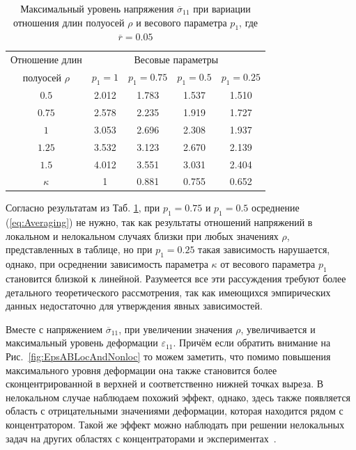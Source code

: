 \begin{table}[htbp]
    \centering
    \begin{threeparttable}%
        \caption{Максимальный уровень напряжения $\overline{\sigma}_{11}$ при вариации отношения длин полуосей $\rho$ и весового параметра $p_1$, где $\overline{r} = 0.05$}\label{tab:MaxStress}%
        \begin{tabular}{|c|c|c|c|c|}
	        \hline
			Отношение длин    & \multicolumn{4}{c|}{Весовые параметры} \\
			\cline{2-5}
			полуосей $\rho$   & $p_1 = 1$ & $p_1 = 0.75$ & $p_1 = 0.5$ & $p_1 = 0.25$ \\
			\hline
			$0.5$             & 2.012     & 1.783        & 1.537       & 1.510 \\
			\hline
			$0.75$            & 2.578     & 2.235        & 1.919       & 1.727 \\
			\hline
			$1$               & 3.053     & 2.696        & 2.308       & 1.937 \\
			\hline
			$1.25$            & 3.532     & 3.123        & 2.670       & 2.139 \\
			\hline
			$1.5$             & 4.012     & 3.551        & 3.031       & 2.404 \\
			\hline
			$\kappa$          & 1         & 0.881        & 0.755       & 0.652 \\
			\hline
        \end{tabular}
    \end{threeparttable}
\end{table}

Согласно результатам из Таб. \ref{tab:MaxStress}, при $p_1 = 0.75$ и $p_1 = 0.5$ осреднение (\ref{eq:Averaging}) не нужно, так как результаты отношений напряжений в локальном и нелокальном случаях близки при любых значениях $\rho$, представленных в таблице, но при $p_1 = 0.25$ такая зависимость нарушается, однако, при осреднении зависимость параметра $\kappa$ от весового параметра $p_1$ становится близкой к линейной. Разумеется все эти рассуждения требуют более детального теоретического рассмотрения, так как имеющихся эмпирических данных недостаточно для утверждения явных зависимостей.

Вместе с напряжением $\overline{\sigma}_{11}$, при увеличении значения $\rho$, увеличивается и максимальный уровень деформации $\varepsilon_{11}$. Причём если обратить внимание на Рис.~\ref{fig:EpsABLocAndNonloc} то можем заметить, что помимо повышения максимального уровня деформации она также становится более сконцентрированной в верхней и соответственно нижней точках выреза. В нелокальном случае наблюдаем похожий эффект, однако, здесь также появляется область с отрицательными значениями деформации, которая находится рядом с концентратором. Такой же эффект можно наблюдать при решении нелокальных задач на других областях с концентраторами \cite{ZAMM} и \mbox{экспериментах \cite{Andreev}.}

